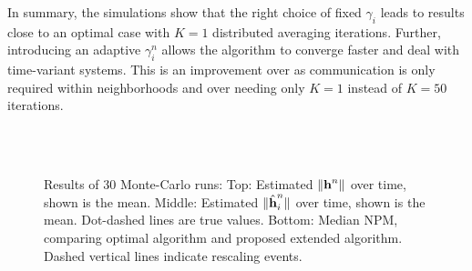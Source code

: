 \documentclass{article}
\begin{document}
In summary, the simulations show that the right choice of fixed \(\gamma_i\) leads to results close to an optimal case with \(K=1\) distributed averaging iterations.
Further, introducing an adaptive \(\gamma_i^n\) allows the algorithm to converge faster and deal with time-variant systems.
This is an improvement over \cite{blochbergerDBSI} as communication is only required within neighborhoods and over \cite{liuDistributedBlindIdentification2016,liuDistributedRecursiveBlind2017} needing only \(K=1\) instead of \(K=50\) iterations.


\begin{figure}[t]
    \centering
    \\\vspace*{-1.0cm}
    \\\vspace*{-1.0cm}
    
    \vspace*{-0.6cm}
    \caption[]{Results of 30 Monte-Carlo runs: Top: Estimated \(\|\bm{\mathrm{h}}^n\|\) over time, shown is the mean. Middle: Estimated \(\|\hat{\bm{\mathrm{h}}}_i^n\|\) over time, shown is the mean. Dot-dashed lines are true values. Bottom: Median NPM, comparing optimal algorithm and proposed extended algorithm. Dashed vertical lines indicate rescaling events.}
    \label{fig:simulations:NPMtimedyn}
\end{figure}
\end{document}
